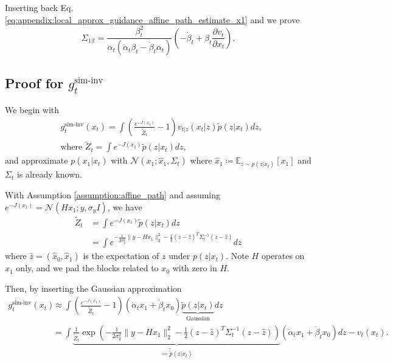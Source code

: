 Inserting back Eq. \eqref{eq:appendix:local_approx_guidance_affine_path_estimate_x1} and we prove 
\begin{equation}
    \Sigma_{1|t}= \frac{\beta_t^2}{\alpha_t(\dot\alpha_t\beta_t - \dot\beta_t\alpha_t)} (-\dot\beta_t+ \beta_t\frac{\partial v_t}{\partial x_t} ).
\end{equation}



\subsection{Proof for $g_t^{\text{sim-inv}}$}\label{appendix:approximate_simple_posterior_pigdm_like}
We begin with
\begin{align}
    &g^{\text{sim-inv}}_t(x_t) = \int \left(\frac{e^{-J(x_1)}}{\tilde{Z}_t} - 1\right) v_{t|z}(x_t|z) \tilde{p}(z|x_t) dz, \\
    &\text{where }\tilde{Z}_t = \int e^{-J(x_1)} \tilde{p}(z|x_t)dz,
\end{align}
and approximate $p(x_1|x_t)$ with $\mathcal{N}(x_1;\hat{x}_1, \Sigma_t)$ where $\hat{x}_1\coloneqq \mathbb{E}_{z\sim p(z|x_t)}[x_1]$ and $\Sigma_t$ is already known.

With Assumption \ref{assumption:affine_path} and assuming $e^{-J(x_1)} = \mathcal{N}(Hx_1;y, \sigma_y I)$, we have 
\begin{align}
    \tilde{Z}_t &= \int e^{-J(x_1)} \tilde{p}(z|x_t)dz \nonumber\\
    &=\int e^{-\frac{1}{2\sigma_y^2}\|y-Hx_1\|^2_2 - \frac{1}{2}(z-\hat{z})^T\Sigma_t^{-1}(z-\hat{z})} dz
\end{align}
where $\hat{z} = (\hat{x}_0, \hat{x}_1)$ is the expectation of $z$ under $p(z|x_t)$. Note $H$ operates on $x_1$ only, and we pad the blocks related to $x_0$ with zero in $H$.


Then, by inserting the Gaussian approximation
\begin{align}
    g^{\text{sim-inv}}_t(x_t) &\approx \int \left(\frac{e^{-J(x_1)}}{\tilde{Z}_t} - 1\right) (\dot\alpha_t x_1 + \dot \beta_t x_0) \underbrace{\tilde{p}(z|x_t)}_{\text{Gaussian}} dz \\
    & = \int \underbrace{\frac{1}{\tilde{Z}_t}\exp\left(-\frac{1}{2\sigma_y^2}\|y-Hx_1\|^2_2 - \frac{1}{2}(z-\hat{z})^T\Sigma_t^{-1}(z-\hat{z})\right)}_{\coloneqq \tilde{\tilde{p}}(z|x_t)} (\dot\alpha_t x_1 + \dot \beta_t x_0)  dz - v_t(x_t).\label{eq:appendix:gaussian_approx_affine_integral_of_g}
\end{align}

